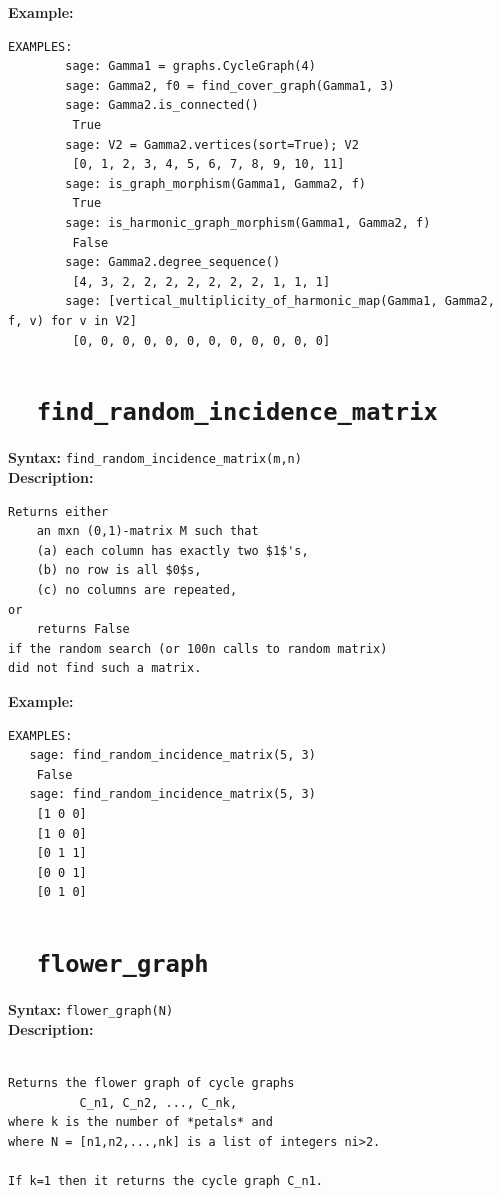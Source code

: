 \documentclass{article}
\begin{document}
\textbf{Example:}
\begin{verbatim}
EXAMPLES:
        sage: Gamma1 = graphs.CycleGraph(4)   
        sage: Gamma2, f0 = find_cover_graph(Gamma1, 3)  
        sage: Gamma2.is_connected()                   
         True
        sage: V2 = Gamma2.vertices(sort=True); V2               
         [0, 1, 2, 3, 4, 5, 6, 7, 8, 9, 10, 11]  
        sage: is_graph_morphism(Gamma1, Gamma2, f)   
         True
        sage: is_harmonic_graph_morphism(Gamma1, Gamma2, f) 
         False
        sage: Gamma2.degree_sequence() 
         [4, 3, 2, 2, 2, 2, 2, 2, 2, 1, 1, 1]
        sage: [vertical_multiplicity_of_harmonic_map(Gamma1, Gamma2, f, v) for v in V2] 
         [0, 0, 0, 0, 0, 0, 0, 0, 0, 0, 0, 0]
\end{verbatim}

\section{\tt \ \ find\_random\_incidence\_matrix}

\textbf{Syntax:} \verb}find_random_incidence_matrix(m,n)}\\

\textbf{Description:}
\begin{verbatim}
Returns either
    an mxn (0,1)-matrix M such that
    (a) each column has exactly two $1$'s, 
    (b) no row is all $0$s, 
    (c) no columns are repeated,
or
    returns False
if the random search (or 100n calls to random matrix)
did not find such a matrix.
\end{verbatim}

\textbf{Example:}
\begin{verbatim}
EXAMPLES:
   sage: find_random_incidence_matrix(5, 3)
    False
   sage: find_random_incidence_matrix(5, 3)
    [1 0 0]
    [1 0 0]
    [0 1 1]
    [0 0 1]
    [0 1 0]
\end{verbatim}

\section{\tt \ \ flower\_graph}

\textbf{Syntax:} \verb}flower_graph(N)}\\

\textbf{Description:}
\begin{verbatim}

Returns the flower graph of cycle graphs 
          C_n1, C_n2, ..., C_nk,
where k is the number of *petals* and
where N = [n1,n2,...,nk] is a list of integers ni>2.

If k=1 then it returns the cycle graph C_n1.
\end{verbatim}
\end{document}
